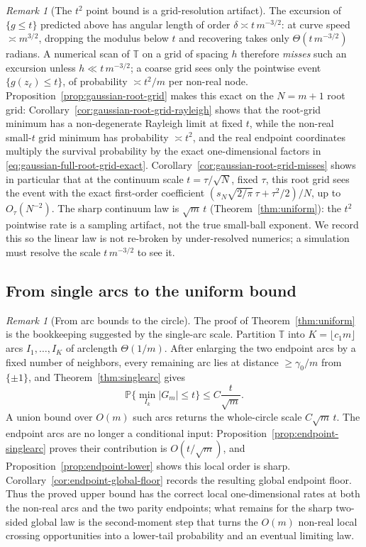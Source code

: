 \documentclass[11pt]{amsart}
\numberwithin{equation}{section}
\theoremstyle{definition}
\theoremstyle{remark}
\newtheorem{remark}[theorem]{Remark}
\newcommand{\T}{\mathbb T}
\newcommand{\Prob}{\mathbb P}
\newcommand{\abs}[1]{\left\lvert #1\right\rvert}
\begin{document}
\begin{remark}[The $t^2$ point bound is a grid-resolution artifact]\label{rem:grid-artifact}
The excursion of $\{g\le t\}$ predicted above has angular length of order $\delta\asymp t\,m^{-3/2}$: at curve speed $\asymp m^{3/2}$, dropping the modulus below $t$ and recovering takes only $\Theta(t\,m^{-3/2})$ radians. A numerical scan of $\T$ on a grid of spacing $h$ therefore \emph{misses} such an excursion unless $h\ll t\,m^{-3/2}$; a coarse grid sees only the pointwise event $\{g(z_\ell)\le t\}$, of probability $\asymp t^2/m$ per non-real node. Proposition~\ref{prop:gaussian-root-grid} makes this exact on the \(N=m+1\) root grid: Corollary~\ref{cor:gaussian-root-grid-rayleigh} shows that the root-grid minimum has a non-degenerate Rayleigh limit at fixed \(t\), while the non-real small-\(t\) grid minimum has probability \(\asymp t^2\), and the real endpoint coordinates multiply the survival probability by the exact one-dimensional factors in \eqref{eq:gaussian-full-root-grid-exact}. Corollary~\ref{cor:gaussian-root-grid-misses} shows in particular that at the continuum scale \(t=\tau/\sqrt N\), fixed \(\tau\), this root grid sees the event with the exact first-order coefficient \((s_N\sqrt{2/\pi}\,\tau+\tau^2/2)/N\), up to \(O_\tau(N^{-2})\). The sharp continuum law is $\sqrt m\,t$ (Theorem~\ref{thm:uniform}): the $t^2$ pointwise rate is a sampling artifact, not the true small-ball exponent. We record this so the linear law is not re-broken by under-resolved numerics; a simulation must resolve the scale $t\,m^{-3/2}$ to see it.
\end{remark}

\subsection{From single arcs to the uniform bound}\label{sub:secondmoment}

\begin{remark}[From arc bounds to the circle]
The proof of Theorem~\ref{thm:uniform} is the bookkeeping suggested by the
single-arc scale.  Partition \(\T\) into \(K=\lfloor c_1m\rfloor\) arcs
\(I_1,\ldots,I_K\) of arclength \(\Theta(1/m)\).  After enlarging the two
endpoint arcs by a fixed number of neighbors, every remaining arc lies at
distance \(\ge\gamma_0/m\) from \(\{\pm1\}\), and
Theorem~\ref{thm:singlearc} gives
\[
  \Prob\{\min_{I_k}\abs{G_m}\le t\}\le C\frac{t}{\sqrt m}.
\]
A union bound over \(O(m)\) such arcs returns the whole-circle scale
\(C\sqrt m\,t\).  The endpoint arcs are no longer a conditional input:
Proposition~\ref{prop:endpoint-singlearc} proves their contribution is
\(O(t/\sqrt m)\), and Proposition~\ref{prop:endpoint-lower} shows this local
order is sharp.  Corollary~\ref{cor:endpoint-global-floor} records the resulting
global endpoint floor.  Thus the proved upper bound has the correct local
one-dimensional rates at both the non-real arcs and the two parity endpoints;
what remains for the sharp two-sided global law is the second-moment step that
turns the \(O(m)\) non-real local crossing opportunities into a lower-tail
probability and an eventual limiting law.
\end{remark}
\end{document}
